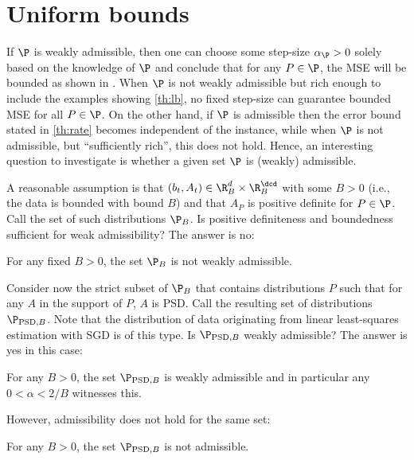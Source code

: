 \section{Uniform bounds}\label{sec:uniform}
If $\P$ is weakly admissible, 
then one can choose some step-size $\alpha_{\P}>0$ solely based on the knowledge of $\P$ and
conclude that for any $P\in \P$, the MSE will be bounded as shown in . 
When $\P$ is not weakly admissible but rich enough to include the examples showing \cref{th:lb}, 
no fixed step-size can guarantee bounded MSE for all $P\in \P$.
On the other hand, if $\P$ is admissible then the error bound stated in  \cref{th:rate} becomes independent of the instance,
while when $\P$ is not admissible, but ``sufficiently rich'', this does not hold.
Hence, an interesting question to investigate is whether a given set $\P$ is (weakly) admissible. 

A reasonable assumption is that $(b_t,A_t)\in \R_B^{d}\times \R_B^{\dcd}$ with some $B>0$ (i.e., the data  is bounded with bound $B$) and that $A_P$ is positive definite for $P\in \P$. Call the set of such distributions $\P_B$.
Is positive definiteness and boundedness sufficient for weak admissibility? The answer is no:
\begin{proposition}\label{lm:notwad}
For any fixed $B>0$,
the set $\P_B$ is not weakly admissible.
\end{proposition}
Consider now the strict subset of $\P_B$ that contains distributions $P$ such that for any $A$ in the support of $P$, $A$ is PSD.
Call the resulting set of distributions $\P_{\text{PSD},B}$.
Note that the distribution of data originating from linear least-squares estimation with SGD is of this type.
Is $\P_{\text{PSD},B}$ weakly admissible? The answer is yes in this case:
\begin{proposition}\label{lm:ppsdbwd}
For any $B>0$, the set $\P_{\text{PSD},B}$ is weakly admissible
and in particular any $0<\alpha < 2/B$ witnesses this.%
\end{proposition}
However, admissibility does not hold for the same set:
\begin{proposition}\label{lm:ppsdbna}
For any $B>0$, the set $\P_{\text{PSD},B}$ is not admissible.
\end{proposition}

